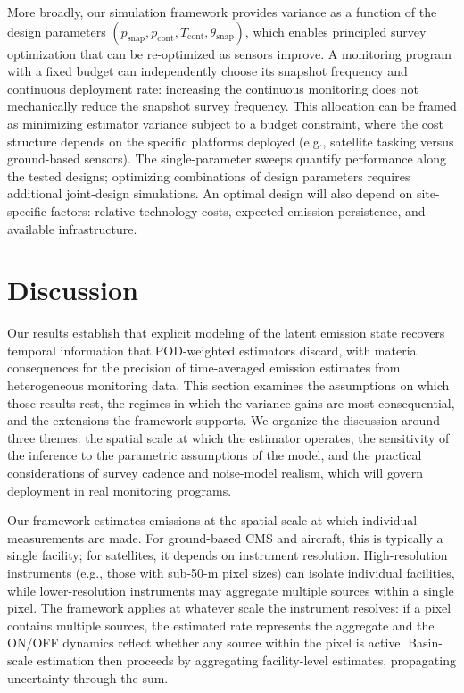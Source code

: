 \documentclass[numsec,webpdf,modern,mediumone]{oup-authoring-template}
\newcommand{\new}[1]{#1}
\newcommand{\edit}[1]{#1}
\begin{document}
More broadly, our simulation framework provides variance as a function of the design parameters $(p_{\text{snap}}, p_{\text{cont}}, T_{\text{cont}}, \theta_{\text{snap}})$, which enables principled survey optimization that can be re-optimized as sensors improve. A monitoring program with a fixed budget can independently choose its snapshot frequency and continuous deployment rate: increasing the continuous monitoring does not mechanically reduce the snapshot survey frequency. This allocation can be framed as minimizing estimator variance subject to a budget constraint, where the cost structure depends on the specific platforms deployed (e.g., satellite tasking versus ground-based sensors). The single-parameter sweeps quantify performance along the tested designs; optimizing combinations of design parameters requires additional joint-design simulations. An optimal design will also depend on site-specific factors: relative technology costs, expected emission persistence, and available infrastructure.


\newpage

\section{Discussion}
\label{sec:discussion}

\new{Our results establish that explicit modeling of the latent emission state recovers temporal information that POD-weighted estimators discard, with material consequences for the precision of time-averaged emission estimates from heterogeneous monitoring data. This section examines the assumptions on which those results rest, the regimes in which the variance gains are most consequential, and the extensions the framework supports. We organize the discussion around three themes: the spatial scale at which the estimator operates, the sensitivity of the inference to the parametric assumptions of the model, and the practical considerations of survey cadence and noise-model realism, which will govern deployment in real monitoring programs.}

Our framework estimates emissions at the spatial scale at which individual measurements are made. For ground-based CMS and aircraft, this is typically a single facility; for satellites, it depends on instrument resolution. \edit{High-resolution instruments (e.g., those with sub-50-m pixel sizes)} can isolate individual facilities, while lower-resolution instruments may aggregate multiple sources within a single pixel.
The framework applies at whatever scale the instrument resolves: if a pixel contains multiple sources, the estimated rate represents the aggregate and the ON/OFF dynamics reflect whether any source within the pixel is active. Basin-scale estimation then proceeds by aggregating facility-level estimates, propagating uncertainty through the sum.
\end{document}
